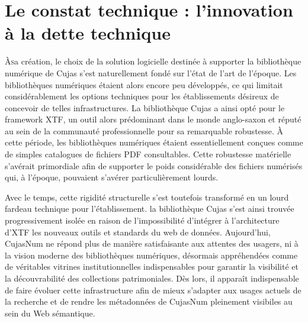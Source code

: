 \chapter[Le constat technique]{Le constat technique : l'innovation à la dette technique}

\lettrine{À} sa création, le choix de la solution logicielle destinée à supporter la bibliothèque numérique de Cujas s'est naturellement fondé sur l'état de l'art de l'époque. Les bibliothèques numériques étaient alors encore peu développés, ce qui limitait considérablement les options techniques pour les établissements désireux de concevoir de telles infrastructures. La bibliothèque Cujas a ainsi opté pour le framework XTF, un outil alors prédominant dans le monde anglo-saxon et réputé au sein de la communauté professionnelle pour sa remarquable robustesse. À cette période, les bibliothèques numériques étaient essentiellement conçues comme de simples catalogues de fichiers PDF consultables. Cette robustesse matérielle s'avérait primordiale afin de supporter le poids considérable des fichiers numérisés qui, à l'époque, pouvaient s'avérer particulièrement lourds.

Avec le temps, cette rigidité structurelle s'est toutefois transformé en un lourd fardeau technique pour l'établissement. la bibliothèque Cujas s'est ainsi trouvée progressivement isolée en raison de l'impossibilité d'intégrer à l'architecture d'XTF les nouveaux outils et standards du web de données. Aujourd'hui, CujasNum ne répond plus de manière satisfaisante aux attentes des usagers, ni à la vision moderne des bibliothèques numériques, désormais appréhendées comme de véritables vitrines institutionnelles indispensables pour garantir la visibilité et la découvrabilité des collections patrimoniales. Dès lors, il apparaît indispensable de faire évoluer cette infrastructure afin de mieux s'adapter aux usages actuels de la recherche et de rendre les métadonnées de CujasNum pleinement visibiles au sein du Web sémantique.



